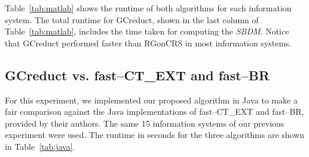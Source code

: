 \documentclass[number,preprint,review,12pt]{elsarticle}
\begin{document}
	Table~\ref{tab:matlab} shows the runtime of both algorithms for each information system. The total runtime for GCreduct, shown in the last column of Table~\ref{tab:matlab}, includes the time taken for computing the \textit{SBDM}. Notice that GCreduct performed faster than RGonCRS in most information systems.

\subsection{GCreduct vs. fast--CT\_EXT and fast--BR}\label{sub:java}
	
	For this experiment, we implemented our proposed algorithm in Java to make a fair comparison against the Java implementations of fast--CT\_EXT and fast--BR, provided by their authors. The same 15 information systems of our previous experiment were used. The runtime in seconds for the three algorithms are shown in Table~\ref{tab:java}.
	
\end{document}
